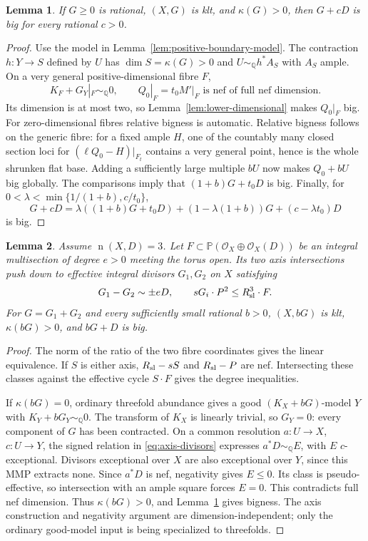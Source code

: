 \documentclass[12pt,a4paper,psamsfonts]{amsart}
\theoremstyle{definition}
\theoremstyle{plain}
\newtheorem{lemma}{Lemma}[section]
\newcommand{\Q}{\mathbb Q}
\newcommand{\OO}{\mathcal O}
\newcommand{\nef}{\operatorname{n}}
\begin{document}
\begin{lemma}\label{lem:positive-boundary}
If $G\ge0$ is rational, $(X,G)$ is klt, and $\kappa(G)>0$,
then $G+cD$ is big for every rational $c>0$.
\end{lemma}
\begin{proof}
Use the model in Lemma~\ref{lem:positive-boundary-model}.
The contraction $h:Y\to S$ defined by $U$ has
$\dim S=\kappa(G)>0$ and $U\sim_\Q h^*A_S$ with $A_S$ ample.
On a very general positive-dimensional fibre $F$,
\[
 K_F+G_Y|_F\sim_\Q0,
 \qquad Q_0|_F=t_0M'|_F\text{ is nef of full nef dimension}.
\]
Its dimension is at most two, so Lemma~\ref{lem:lower-dimensional}
makes $Q_0|_F$ big. For zero-dimensional fibres relative bigness
is automatic. Relative bigness follows on the generic fibre: for a fixed ample
$H$, one of the countably many closed section loci for
$(\ell Q_0-H)|_{F_t}$ contains a very general point, hence is the
whole shrunken flat base. Adding a sufficiently large multiple
$bU$ now makes $Q_0+bU$ big globally. The comparisons imply
that $(1+b)G+t_0D$ is big. Finally, for
$0<\lambda<\min\{1/(1+b),c/t_0\}$,
\[
 G+cD=\lambda((1+b)G+t_0D)
 +(1-\lambda(1+b))G+(c-\lambda t_0)D
\]
is big.
\end{proof}

\begin{lemma}\label{lem:multisection-axes}
Assume $\nef(X,D)=3$. Let $F\subset
\mathbb P(\OO_X\oplus\OO_X(D))$ be an integral multisection
of degree $e>0$ meeting the torus open. Its two axis intersections
push down to effective integral divisors $G_1,G_2$ on $X$ satisfying
\begin{equation}\label{eq:axis-divisors}
 G_1-G_2\sim\pm eD,\qquad
 sG_i\cdot P^2\le R_{\rm sl}^3\cdot F.
\end{equation}
For $G=G_1+G_2$ and every sufficiently small rational $b>0$,
$(X,bG)$ is klt, $\kappa(bG)>0$, and $bG+D$ is big.
\end{lemma}
\begin{proof}
The norm of the ratio of the two fibre coordinates gives the
linear equivalence. If $S$ is either axis, $R_{\rm sl}-sS$
and $R_{\rm sl}-P$ are nef. Intersecting these classes against
the effective cycle $S\cdot F$ gives the degree inequalities.

If $\kappa(bG)=0$, ordinary threefold abundance gives a good
$(K_X+bG)$-model $Y$ with $K_Y+bG_Y\sim_\Q0$.
The transform of $K_X$ is linearly trivial, so $G_Y=0$:
every component of $G$ has been contracted. On a common
resolution $a:U\to X$, $c:U\to Y$, the signed relation in
\eqref{eq:axis-divisors} expresses $a^*D\sim_\Q E$, with
$E$ $c$-exceptional. Divisors exceptional over $X$ are also
exceptional over $Y$, since this MMP extracts none.
Since $a^*D$ is nef, negativity gives $E\le0$.
Its class is pseudo-effective, so intersection with an ample
square forces $E=0$. This contradicts full nef dimension.
Thus $\kappa(bG)>0$, and Lemma~\ref{lem:positive-boundary}
gives bigness. The axis construction and negativity argument
are dimension-independent; only the ordinary good-model input
is being specialized to threefolds.
\end{proof}
\end{document}
